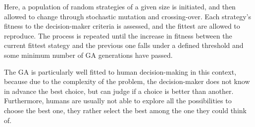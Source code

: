 \documentclass[12pt,a4paper]{article}
\begin{document}
Here, a population of random strategies of a given size is initiated, and then allowed to change through stochastic mutation and crossing-over. 
Each strategy's fitness to the decision-maker criteria is assessed, and the fittest are allowed to reproduce.
The process is repeated until the increase in fitness between the current fittest stategy and the previous one falls under a defined threshold and some minimum number of GA generations have passed.

The GA is particularly well fitted to human decision-making in this context, because due to the complexity of the problem, the decision-maker does not know in advance the best choice, but can judge if a choice is better than another.
Furthermore, humans are usually not able to explore all the possibilities to choose the best one, they rather select the best among the one they could think of.
%
%
\end{document}
